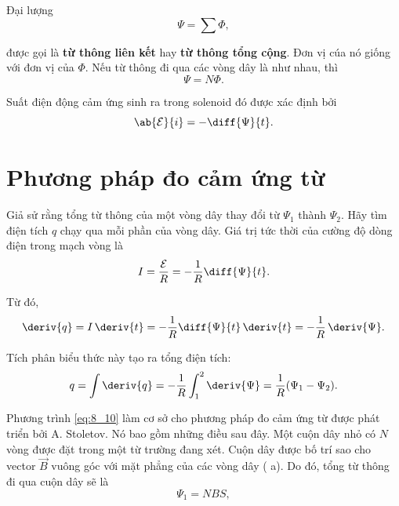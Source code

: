 Đại lượng
\begin{equation}\label{eq:8_7}
    \Psi = \sum \Phi,
\end{equation}

\noindent
được gọi là \textbf{từ thông liên kết} hay \textbf{từ thông tổng cộng}. Đơn vị cúa nó giống với đơn vị của $\Phi$.
Nếu từ thông đi qua các vòng dây là như nhau, thì
\begin{equation}\label{eq:8_8}
    \Psi = N \Phi.
\end{equation}

\noindent
Suất điện động cảm ứng sinh ra trong solenoid đó được xác định bởi
\begin{equation}\label{eq:8_9}
    \ab{\mathcal{E}}{i} = - \diff{\Psi}{t}.
\end{equation}

\section{Phương pháp đo cảm ứng từ}\label{sec:8_3}

Giả sử rằng tổng từ thông của một vòng dây thay đổi từ $\Psi_1$ thành $\Psi_2$.
Hãy tìm điện tích $q$ chạy qua mỗi phần của vòng dây.
Giá trị tức thời của cường độ dòng điện trong mạch vòng là
\begin{equation*}
	I = \frac{\mathcal{E}}{R} = - \frac{1}{R} \diff{\Psi}{t}.
\end{equation*}

\noindent
Từ đó,
\begin{equation*}
	\deriv{q} = I\, \deriv{t} = - \frac{1}{R} \diff{\Psi}{t}\, \deriv{t} = - \frac{1}{R}\, \deriv{\Psi}.
\end{equation*}

\noindent
Tích phân biểu thức này tạo ra tổng điện tích:
\begin{equation}\label{eq:8_10}
	q = \int \deriv{q} = - \frac{1}{R} \int_1^2 \deriv{\Psi} = \frac{1}{R} (\Psi_1 - \Psi_2).
\end{equation}

Phương trình \eqref{eq:8_10} làm cơ sở cho phương pháp đo cảm ứng từ được phát triển bởi A. Stoletov.
Nó bao gồm những điều sau đây.
Một cuộn dây nhỏ có $N$ vòng được đặt trong một từ trường đang xét.
Cuộn dây được bố trí sao cho vector $\vec{B}$ vuông góc với mặt phẳng của các vòng dây ( a).
Do đó, tổng từ thông đi qua cuộn dây sẽ là
\begin{equation*}
	\Psi_1 = NBS,
\end{equation*}

